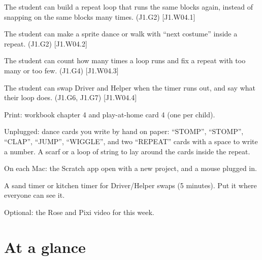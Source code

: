 
\begin{objectives}
  \item The student can build a repeat loop that runs the same blocks again, instead of snapping on the same blocks many times. (J1.G2) [J1.W04.1]
  \item The student can make a sprite dance or walk with \enquote{next costume} inside a repeat. (J1.G2) [J1.W04.2]
  \item The student can count how many times a loop runs and fix a repeat with too many or too few. (J1.G4) [J1.W04.3]
  \item The student can swap Driver and Helper when the timer runs out, and say what their loop does. (J1.G6, J1.G7) [J1.W04.4]
\end{objectives}

\begin{materials}
  \item Print: workbook chapter 4 and play-at-home card 4 (one per child).
  \item Unplugged: dance cards you write by hand on paper: \enquote{STOMP}, \enquote{STOMP}, \enquote{CLAP}, \enquote{JUMP}, \enquote{WIGGLE}, and two \enquote{REPEAT} cards with a space to write a number. A scarf or a loop of string to lay around the cards inside the repeat.
  \item On each Mac: the Scratch app open with a new project, and a mouse plugged in.
  \item A sand timer or kitchen timer for Driver/Helper swaps (5 minutes). Put it where everyone can see it.
  \item Optional: the Rose and Pixi video for this week.
\end{materials}

\section{At a glance}
\begin{timeplan}
\end{timeplan}

